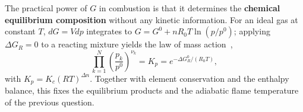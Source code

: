 {The practical power of $G$ in combustion is that it determines the \textbf{chemical equilibrium composition} without any kinetic information. For an ideal gas at constant $T$, $dG = V dp$ integrates to $G = G^0 + nR_0T \ln(p/p^0)$; applying $\Delta G_R = 0$ to a reacting mixture yields the law of mass action~\cite{lecture2,warnatz2006combustion},
\begin{equation*}
\prod_{k=1}^{N} \left(\frac{p_k}{p^0}\right)^{\nu_k} = K_p = e^{-\Delta G_R^0 / (R_0 T)},
\end{equation*}
with $K_p = K_c (R T)^{\Delta n}$. Together with element conservation and the enthalpy balance, this fixes the equilibrium products and the adiabatic flame temperature of the previous question.
}



